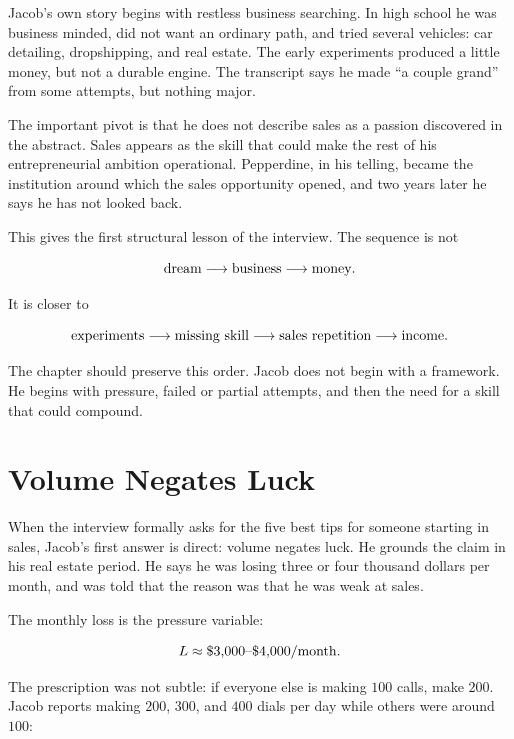 Jacob's own story begins with restless business searching. In high school he was business minded, did not want an ordinary path, and tried several vehicles: car detailing, dropshipping, and real estate. The early experiments produced a little money, but not a durable engine. The transcript says he made ``a couple grand'' from some attempts, but nothing major.

The important pivot is that he does not describe sales as a passion discovered in the abstract. Sales appears as the skill that could make the rest of his entrepreneurial ambition operational. Pepperdine, in his telling, became the institution around which the sales opportunity opened, and two years later he says he has not looked back.

This gives the first structural lesson of the interview. The sequence is not

\begin{equation}
\hbox{dream} \longrightarrow \hbox{business} \longrightarrow \hbox{money}.
\end{equation}

It is closer to

\begin{equation}
\hbox{experiments} \longrightarrow \hbox{missing skill} \longrightarrow \hbox{sales repetition} \longrightarrow \hbox{income}.
\end{equation}

The chapter should preserve this order. Jacob does not begin with a framework. He begins with pressure, failed or partial attempts, and then the need for a skill that could compound.

\section{Volume Negates Luck}

When the interview formally asks for the five best tips for someone starting in sales, Jacob's first answer is direct: volume negates luck. He grounds the claim in his real estate period. He says he was losing three or four thousand dollars per month, and was told that the reason was that he was weak at sales.

The monthly loss is the pressure variable:

\begin{equation}
L \approx \$3{,}000\hbox{--}\$4{,}000/\mathrm{month}.
\end{equation}

The prescription was not subtle: if everyone else is making \(100\) calls, make \(200\). Jacob reports making \(200\), \(300\), and \(400\) dials per day while others were around \(100\):

